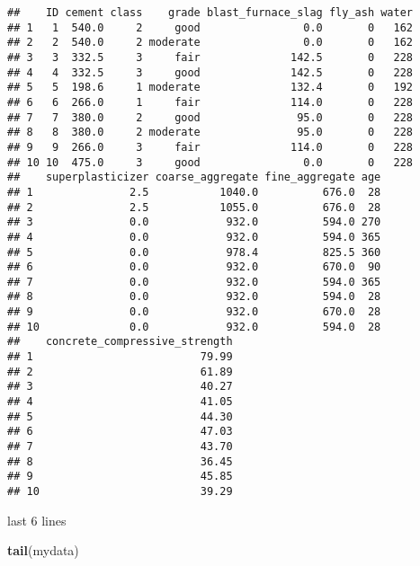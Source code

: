 \documentclass[]{article}
\newenvironment{Shaded}{\begin{snugshade}}{\end{snugshade}}
\newcommand{\KeywordTok}[1]{\textcolor[rgb]{0.13,0.29,0.53}{\textbf{#1}}}
\newcommand{\NormalTok}[1]{#1}
\begin{document}
\begin{verbatim}
##    ID cement class    grade blast_furnace_slag fly_ash water
## 1   1  540.0     2     good                0.0       0   162
## 2   2  540.0     2 moderate                0.0       0   162
## 3   3  332.5     3     fair              142.5       0   228
## 4   4  332.5     3     good              142.5       0   228
## 5   5  198.6     1 moderate              132.4       0   192
## 6   6  266.0     1     fair              114.0       0   228
## 7   7  380.0     2     good               95.0       0   228
## 8   8  380.0     2 moderate               95.0       0   228
## 9   9  266.0     3     fair              114.0       0   228
## 10 10  475.0     3     good                0.0       0   228
##    superplasticizer coarse_aggregate fine_aggregate age
## 1               2.5           1040.0          676.0  28
## 2               2.5           1055.0          676.0  28
## 3               0.0            932.0          594.0 270
## 4               0.0            932.0          594.0 365
## 5               0.0            978.4          825.5 360
## 6               0.0            932.0          670.0  90
## 7               0.0            932.0          594.0 365
## 8               0.0            932.0          594.0  28
## 9               0.0            932.0          670.0  28
## 10              0.0            932.0          594.0  28
##    concrete_compressive_strength
## 1                          79.99
## 2                          61.89
## 3                          40.27
## 4                          41.05
## 5                          44.30
## 6                          47.03
## 7                          43.70
## 8                          36.45
## 9                          45.85
## 10                         39.29
\end{verbatim}

last 6 lines

\begin{Shaded}
\begin{Highlighting}[]
\KeywordTok{tail}\NormalTok{(mydata)}
\end{Highlighting}
\end{Shaded}
\end{document}
